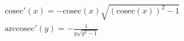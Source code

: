 \begin{multline*}
  \mathrm{cosec}'(x)=-\mathrm{cosec}(x)\sqrt{(\mathrm{cosec}(x))^2-1} \\ \mathrm{arccosec}'(y)=-\frac{1}{y\sqrt{y^2-1}}
\end{multline*}
